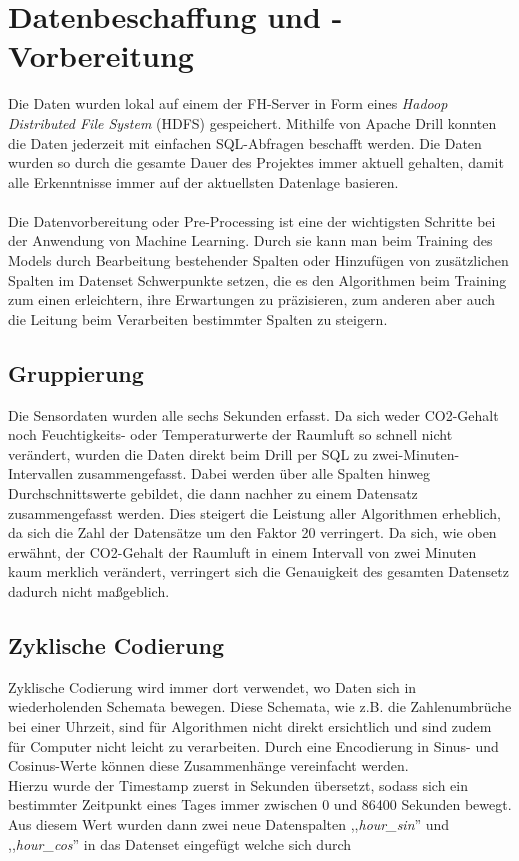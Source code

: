 \section{Datenbeschaffung und -Vorbereitung}
Die Daten wurden lokal auf einem der FH-Server in Form eines \textit{Hadoop Distributed File System} (HDFS) 
gespeichert. Mithilfe von Apache Drill konnten die Daten jederzeit mit einfachen SQL-Abfragen beschafft werden. 
Die Daten wurden so durch die gesamte Dauer des Projektes immer aktuell gehalten, damit alle Erkenntnisse 
immer auf der aktuellsten Datenlage basieren.
\\\\
Die Datenvorbereitung oder Pre-Processing ist eine der wichtigsten Schritte bei der Anwendung von Machine 
Learning. Durch sie kann man beim Training des Models durch Bearbeitung bestehender Spalten oder Hinzufügen 
von zusätzlichen Spalten im Datenset Schwerpunkte setzen, die es den Algorithmen beim Training zum einen 
erleichtern, ihre Erwartungen zu präzisieren, zum anderen aber auch die Leitung beim Verarbeiten bestimmter 
Spalten zu steigern.
\subsection{Gruppierung}
Die Sensordaten wurden alle sechs Sekunden erfasst. Da sich weder CO2-Gehalt noch Feuchtigkeits- oder 
Temperaturwerte der Raumluft so schnell nicht verändert, wurden die Daten direkt beim Drill per SQL zu 
zwei-Minuten-Intervallen zusammengefasst. Dabei werden über alle Spalten hinweg Durchschnittswerte gebildet, 
die dann nachher zu einem Datensatz zusammengefasst werden. 
Dies steigert die Leistung aller Algorithmen erheblich, da sich die Zahl der 
Datensätze um den Faktor 20 verringert. Da sich, wie oben erwähnt, der CO2-Gehalt der Raumluft in einem 
Intervall von zwei Minuten kaum merklich verändert, verringert sich die Genauigkeit des gesamten Datensetz 
dadurch nicht maßgeblich.
\subsection{Zyklische Codierung}
Zyklische Codierung wird immer dort verwendet, wo Daten sich in wiederholenden Schemata bewegen. Diese 
Schemata, wie z.B. die Zahlenumbrüche bei einer Uhrzeit, sind für Algorithmen nicht direkt ersichtlich und 
sind zudem für Computer nicht leicht zu verarbeiten. Durch eine Encodierung in 
Sinus- und Cosinus-Werte können diese Zusammenhänge vereinfacht werden.\\
Hierzu wurde der Timestamp zuerst in Sekunden übersetzt, sodass sich ein bestimmter Zeitpunkt eines Tages 
immer zwischen 0 und 86400 Sekunden bewegt.
Aus diesem Wert wurden dann zwei neue Datenspalten ,,\textit{hour\_sin}'' und ,,\textit{hour\_cos}'' 
in das Datenset eingefügt welche sich durch 

